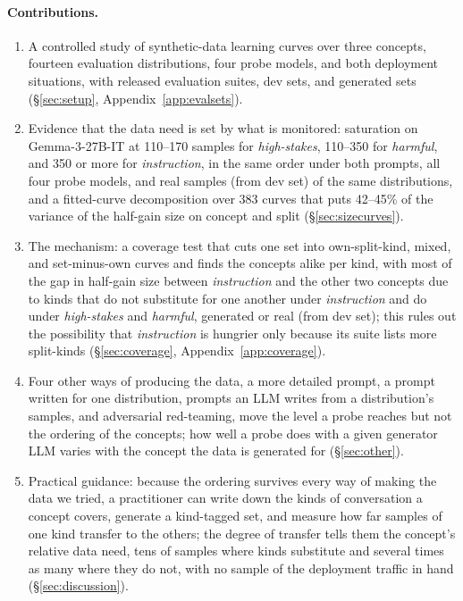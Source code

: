 \documentclass{article} %
\newcommand{\hs}{\emph{high-stakes}}
\newcommand{\harm}{\emph{harmful}}
\newcommand{\instr}{\emph{instruction}}
\begin{document}
\paragraph{Contributions.}
\begin{enumerate}[leftmargin=*,itemsep=1pt]
  \item A controlled study of synthetic-data learning curves over three concepts, fourteen evaluation distributions, four probe models, and both deployment situations, with released evaluation suites, dev sets, and generated sets (\S\ref{sec:setup}, Appendix~\ref{app:evalsets}).
  \item Evidence that the data need is set by what is monitored: saturation on Gemma-3-27B-IT at 110--170 samples for \hs{}, 110--350 for \harm{}, and 350 or more for \instr{}, in the same order under both prompts, all four probe models, and real samples (from dev set) of the same distributions, and a fitted-curve decomposition over 383 curves that puts 42--45\% of the variance of the half-gain size on concept and split (\S\ref{sec:sizecurves}).
  \item The mechanism: a coverage test that cuts one set into own-split-kind, mixed, and set-minus-own curves and finds the concepts alike per kind, with most of the gap in half-gain size between \instr{} and the other two concepts due to kinds that do not substitute for one another under \instr{} and do under \hs{} and \harm{}, generated or real (from dev set); this rules out the possibility that \instr{} is hungrier only because its suite lists more split-kinds (\S\ref{sec:coverage}, Appendix~\ref{app:coverage}).
  \item Four other ways of producing the data, a more detailed prompt, a prompt written for one distribution, prompts an LLM writes from a distribution's samples, and adversarial red-teaming, move the level a probe reaches but not the ordering of the concepts; how well a probe does with a given generator LLM varies with the concept the data is generated for (\S\ref{sec:other}).
  \item Practical guidance: because the ordering survives every way of making the data we tried, a practitioner can write down the kinds of conversation a concept covers, generate a kind-tagged set, and measure how far samples of one kind transfer to the others; the degree of transfer tells them the concept's relative data need, tens of samples where kinds substitute and several times as many where they do not, with no sample of the deployment traffic in hand (\S\ref{sec:discussion}).
\end{enumerate}
\end{document}
